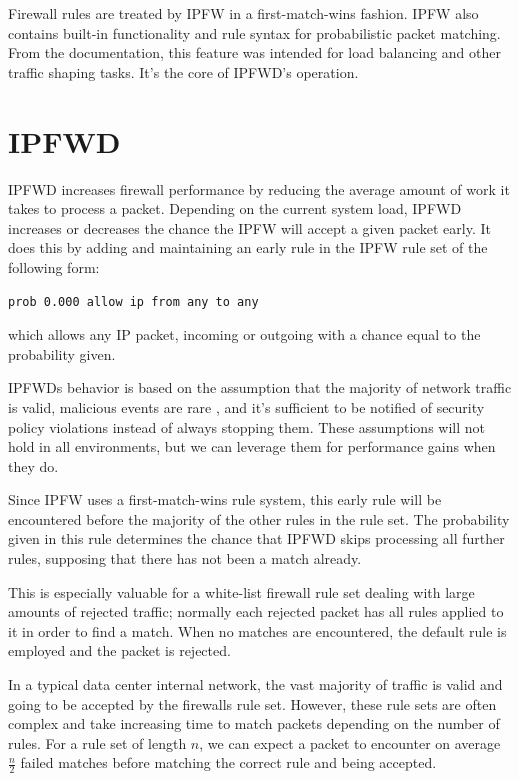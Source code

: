 \documentclass[journal]{IEEEtran}
\begin{document}
    Firewall rules are treated by IPFW in a first-match-wins fashion. IPFW also
    contains built-in functionality and rule syntax for probabilistic packet
    matching. From the documentation, this feature was intended for load
    balancing and other traffic shaping tasks. It's the core of IPFWD's
    operation. 


\section{IPFWD}

  IPFWD increases firewall performance by reducing the average amount of work
  it takes to process a packet. Depending on the current system load, IPFWD
  increases or decreases the chance the IPFW will accept a given packet early.
  It does this by adding and maintaining an early rule in the IPFW rule set of
  the following form: 
  \begin{center}
      \verb|prob 0.000 allow ip from any to any|
  \end{center}
  which allows any IP packet, incoming or outgoing with a chance equal to the
  probability given.

  IPFWDs behavior is based on the assumption that the majority of network
  traffic is valid, malicious events are rare \cite{networktrafficanalysis},
  and it's sufficient to be notified of security policy violations instead of
  always stopping them. These assumptions will not hold in all environments,
  but we can leverage them for performance gains when they do.

  Since IPFW uses a first-match-wins rule system, this early rule will be
  encountered before the majority of the other rules in the rule set.  The
  probability given in this rule determines the chance that IPFWD skips
  processing all further rules, supposing that there has not been a match
  already.  

  This is especially valuable for a white-list firewall rule set dealing with
  large amounts of rejected traffic; normally each rejected packet has all
  rules applied to it in order to find a match. When no matches are
  encountered, the default rule is employed and the packet is rejected. 

  In a typical data center internal network, the vast majority of traffic is
  valid and going to be accepted by the firewalls rule set. However, these rule
  sets are often complex and take increasing time to match packets depending on
  the number of rules. For a rule set of length $n$, we can expect a packet to
  encounter on average $\frac{n}{2}$ failed matches before matching the correct
  rule and being accepted.
\end{document}
